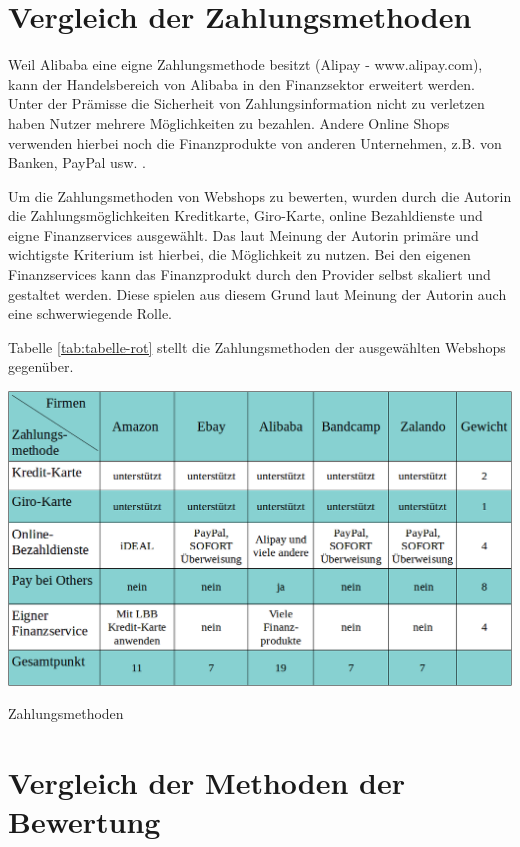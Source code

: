 \section{Vergleich der Zahlungsmethoden}

Weil Alibaba eine eigne Zahlungsmethode besitzt (Alipay - www.alipay.com), kann der Handelsbereich von Alibaba in den Finanzsektor erweitert werden. Unter der Prämisse die Sicherheit von Zahlungsinformation nicht zu verletzen haben Nutzer mehrere Möglichkeiten zu bezahlen. Andere Online Shops verwenden hierbei noch die Finanzprodukte von anderen Unternehmen, z.B. von Banken, PayPal usw. .

Um die Zahlungsmethoden von Webshops zu bewerten, wurden durch die Autorin die Zahlungsmöglichkeiten Kreditkarte, Giro-Karte, online Bezahldienste und eigne Finanzservices ausgewählt. Das laut Meinung der Autorin primäre und wichtigste Kriterium ist hierbei, die Möglichkeit  zu nutzen. Bei den eigenen Finanzservices kann das Finanzprodukt durch den Provider selbst skaliert und gestaltet werden. Diese spielen aus diesem Grund laut Meinung der Autorin auch eine schwerwiegende Rolle.

Tabelle \vref{tab:tabelle-rot} stellt die Zahlungsmethoden der ausgewählten Webshops gegenüber.

\begin{table}[htbp]
	\centering
	\includegraphics[width=1\textwidth]{bilder/tabelle-blau.png}
	\caption{Zahlungsmethoden}
	\label{tab:tabelle-blau}
\end{table}


\section{Vergleich der Methoden der Bewertung}

